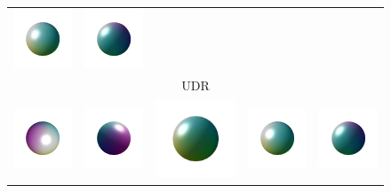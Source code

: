 \documentclass[runningheads]{llncs}
\begin{document}
\begin{figure}[t]
\begin{tabular}{ccccc}
         \includegraphics[width=0.2\columnwidth]{color/udr/eval_10000_4.png} &
         \includegraphics[width=0.2\columnwidth]{color/udr/eval_10000_3.png} \vspace{-10pt} \\ 
         & & {UDR} & & \\
         \includegraphics[width=0.2\columnwidth]{color/gt/eval_10000_4.png} &  
         \includegraphics[width=0.2\columnwidth]{color/gt/eval_10000_1.png} &
         \includegraphics[width=0.2\columnwidth]{color/gt/eval_10000_2.png} &
         \includegraphics[width=0.2\columnwidth]{color/gt/eval_10000_3.png} &
         \includegraphics[width=0.2\columnwidth]{color/gt/eval_10000_9.png} \vspace{-10pt} \\ 

\end{tabular}
\end{figure}
\end{document}
